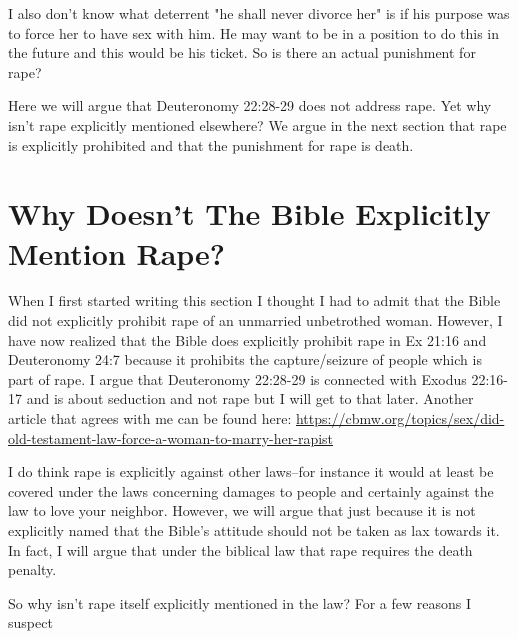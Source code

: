 \documentclass[11pt]{article}
\begin{document}
I also don't know what deterrent "he shall never divorce her" is if his purpose was to force her to have sex with him. He may want to be in a position to do this in the future and this would be his ticket.
So is there an actual punishment for rape?

Here we will argue that Deuteronomy 22:28-29 does not address rape. Yet why isn't rape explicitly mentioned elsewhere? We argue in the next section that rape is explicitly prohibited and that the punishment for rape is death.

\section{Why Doesn't The Bible Explicitly Mention Rape?} \label{bible mention rape}
 When I first started writing this section I thought I had to admit that the Bible did not explicitly prohibit rape of an unmarried unbetrothed woman. However, I have now realized that the Bible does explicitly prohibit rape in Ex 21:16 and Deuteronomy 24:7 because it prohibits the capture/seizure of people which is part of rape. I argue that Deuteronomy 22:28-29 is connected with Exodus 22:16-17 and is about seduction and not rape but I will get to that later. Another article that agrees with me can be found here: \url{https://cbmw.org/topics/sex/did-old-testament-law-force-a-woman-to-marry-her-rapist}

I do think rape is explicitly against other laws–for instance it would at least be covered under the laws concerning damages to people and certainly against the law to love your neighbor. However, we will argue that just because it is not explicitly named that the Bible’s attitude should not be taken as lax towards it. In fact, I will argue that under the biblical law that rape requires the death penalty.

So why isn’t rape itself explicitly mentioned in the law? For a few reasons I suspect
\end{document}
